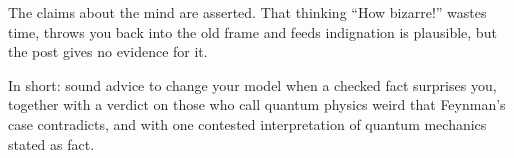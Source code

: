 \begin{afterword}
The claims about the mind are asserted. That thinking ``How bizarre!'' wastes time, throws you back into the old frame and feeds indignation is plausible, but the post gives no evidence for it.

In short: sound advice to change your model when a checked fact surprises you, together with a verdict on those who call quantum physics weird that Feynman's case contradicts, and with one contested interpretation of quantum mechanics stated as fact.
\end{afterword}
